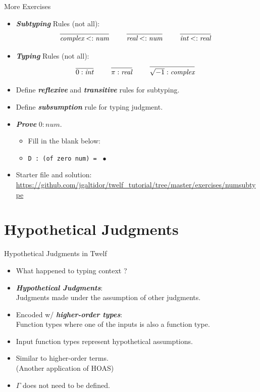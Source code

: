 \documentclass{beamer}
\renewcommand{\emph}[1]{\textbf{\textit{#1}}}
\begin{document}
\begin{frame}{More Exercises}
\begin{itemize}
\item \emph{Subtyping} Rules (not all):
\[
\infer{\textit{complex} <: \textit{num}}{ }
\qquad
\infer{\textit{real} <: \textit{num}}{ }
\qquad
\infer{\textit{int} <: \textit{real}}{ }
\]
\item \emph{Typing} Rules (not all):
\[
\infer{0 : \textit{int}}{ }
\qquad
\infer{\pi : \textit{real}}{ }
\qquad
\infer{\sqrt{-1} : \textit{complex}}{ }
\]
\item Define \emph{reflexive} and \emph{transitive} rules for subtyping.
\item Define \emph{subsumption} rule for typing judgment.
\item \emph{Prove} $0 : \textit{num}$.
	\begin{itemize}
	\item Fill in the blank below:
	\item \texttt{D : (of zero num) = } $\bullet$
	\end{itemize}
\item Starter file and solution: \\
{\footnotesize \url{https://github.com/jgaltidor/twelf_tutorial/tree/master/exercises/numsubtype}}
\end{itemize}
\end{frame}



\section{Hypothetical Judgments}

\begin{frame}{Hypothetical Judgments in Twelf}
\begin{itemize}
\item What happened to typing context \cemph{$\Gamma$}?

\pause
\item \emph{Hypothetical Judgments}: \\
Judgments made under the assumption of other judgments.

\pause
\item Encoded w/ \emph{higher-order types}: \\
Function types where one of the inputs is also a
function type.

\pause
\item Input function types represent hypothetical assumptions.
\item Similar to higher-order terms. \\
(Another application of HOAS)
\item $\Gamma$ does not need to be defined.
\end{itemize}
\end{frame}
\end{document}
